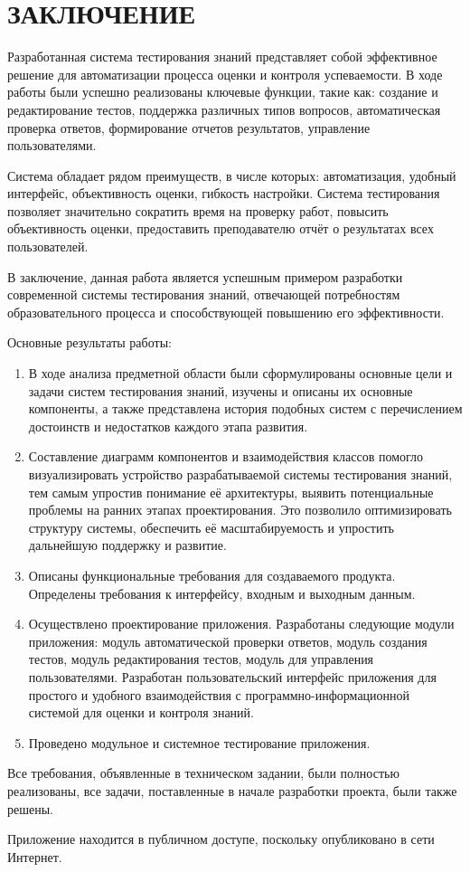 \section*{ЗАКЛЮЧЕНИЕ}

Разработанная система тестирования знаний представляет собой эффективное решение для автоматизации процесса оценки и контроля успеваемости. В ходе работы были успешно реализованы ключевые функции, такие как: создание и редактирование тестов, поддержка различных типов вопросов, автоматическая проверка ответов, формирование отчетов результатов, управление пользователями.

Система обладает рядом преимуществ, в числе которых: автоматизация, удобный интерфейс, объективность оценки, гибкость настройки. Система тестирования позволяет значительно сократить время на проверку работ, повысить объективность оценки, предоставить преподавателю отчёт о результатах всех пользователей.

В заключение, данная работа является успешным примером разработки современной системы тестирования знаний, отвечающей потребностям образовательного процесса и способствующей повышению его эффективности.

Основные результаты работы:

\begin{enumerate}
\item В ходе анализа предметной области были сформулированы основные цели и задачи систем тестирования знаний, изучены и описаны их основные компоненты, а также представлена история подобных систем с перечислением достоинств и недостатков каждого этапа развития.
\item Составление диаграмм компонентов и взаимодействия классов помогло визуализировать устройство разрабатываемой системы тестирования знаний, тем самым упростив понимание её архитектуры, выявить потенциальные проблемы на ранних этапах проектирования. Это позволило оптимизировать структуру системы, обеспечить её масштабируемость и упростить дальнейшую поддержку и развитие.
\item Описаны функциональные требования для создаваемого продукта. Определены требования к интерфейсу, входным и выходным данным.
\item Осуществлено проектирование приложения. Разработаны следующие модули приложения: модуль автоматической проверки ответов, модуль создания тестов, модуль редактирования тестов, модуль для управления пользователями. Разработан пользовательский интерфейс приложения для простого и удобного взаимодействия с программно-информационной системой для оценки и контроля  знаний.
\item Проведено модульное и системное тестирование приложения.
\end{enumerate}

Все требования, объявленные в техническом задании, были полностью реализованы, все задачи, поставленные в начале разработки проекта, были также решены.

Приложение находится в публичном доступе, поскольку опубликовано в сети Интернет.  
